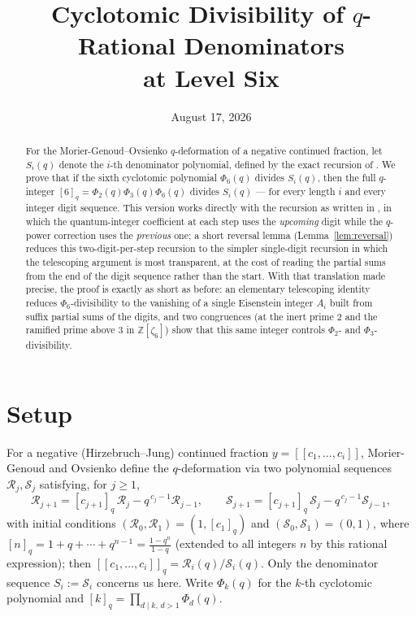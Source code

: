 \documentclass[11pt]{article}
\title{Cyclotomic Divisibility of $q$-Rational Denominators\\ at Level Six}
\author{}
\date{August 17, 2026}
\theoremstyle{remark}
\newcommand{\Z}{\mathbb{Z}}
\newcommand{\qint}[1]{[#1]_q}
\begin{document}
\maketitle

\begin{abstract}
For the Morier-Genoud--Ovsienko $q$-deformation of a negative continued fraction, let $S_i(q)$
denote the $i$-th denominator polynomial, defined by the exact recursion of \cite{MO20}. We
prove that if the sixth cyclotomic polynomial $\Phi_6(q)$ divides $S_i(q)$, then the full
$q$-integer $[6]_q=\Phi_2(q)\Phi_3(q)\Phi_6(q)$ divides $S_i(q)$ --- for every length $i$ and
every integer digit sequence. This version works directly with the recursion as written in
\cite{MO20}, in which the quantum-integer coefficient at each step uses the \emph{upcoming}
digit while the $q$-power correction uses the \emph{previous} one; a short reversal lemma
(Lemma~\ref{lem:reversal}) reduces this two-digit-per-step recursion to the simpler
single-digit recursion in which the telescoping argument is most transparent, at the cost of
reading the partial sums from the end of the digit sequence rather than the start. With that
translation made precise, the proof is exactly as short as before: an elementary telescoping
identity reduces $\Phi_6$-divisibility to the vanishing of a single Eisenstein integer $A_i$
built from suffix partial sums of the digits, and two congruences (at the inert prime $2$ and
the ramified prime above $3$ in $\Z[\zeta_6]$) show that this same integer controls
$\Phi_2$- and $\Phi_3$-divisibility.
\end{abstract}

\section{Setup}

For a negative (Hirzebruch--Jung) continued fraction $y=[[c_1,\dots,c_i]]$, Morier-Genoud and
Ovsienko \cite{MO20} define the $q$-deformation via two polynomial sequences $\mathcal
R_j,\mathcal S_j$ satisfying, for $j\ge1$,
\begin{equation}\label{eq:mgo}
\mathcal R_{j+1}=\qint{c_{j+1}}\,\mathcal R_j-q^{\,c_j-1}\mathcal R_{j-1},\qquad
\mathcal S_{j+1}=\qint{c_{j+1}}\,\mathcal S_j-q^{\,c_j-1}\mathcal S_{j-1},
\end{equation}
with initial conditions $(\mathcal R_0,\mathcal R_1)=(1,\qint{c_1})$ and $(\mathcal S_0,\mathcal
S_1)=(0,1)$, where $\qint{n}=1+q+\cdots+q^{n-1}=\frac{1-q^n}{1-q}$ (extended to all integers
$n$ by this rational expression); then $[[c_1,\dots,c_i]]_q=\mathcal R_i(q)/\mathcal S_i(q)$.
Only the denominator sequence $S_i:=\mathcal S_i$ concerns us here. Write $\Phi_k(q)$ for the
$k$-th cyclotomic polynomial and $[k]_q=\prod_{d\mid k,\,d>1}\Phi_d(q)$.
\end{document}
